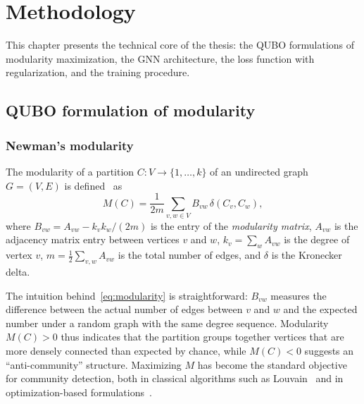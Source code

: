 
\section{Methodology}
\label{sec:methodology}

This chapter presents the technical core of the thesis: the QUBO
formulations of modularity maximization, the GNN architecture, the
loss function with regularization, and the training procedure.

\subsection{QUBO formulation of modularity}
\label{sec:method_qubo}

\subsubsection{Newman's modularity}
\label{sec:method_modularity}

The modularity of a partition $C: V \to \{1, \ldots, k\}$ of an
undirected graph $G = (V, E)$ is defined~\cite{newman2006modularity}
as
\begin{equation}
    M(C) = \frac{1}{2m} \sum_{v, w \in V} B_{vw} \, \delta(C_v, C_w),
    \label{eq:modularity}
\end{equation}
where $B_{vw} = A_{vw} - k_v k_w / (2m)$ is the entry of the
\emph{modularity matrix}, $A_{vw}$ is the adjacency matrix entry
between vertices $v$ and $w$, $k_v = \sum_w A_{vw}$ is the degree of
vertex $v$, $m = \frac{1}{2}\sum_{v, w} A_{vw}$ is the total number
of edges, and $\delta$ is the Kronecker delta.

The intuition behind~\eqref{eq:modularity} is straightforward:
$B_{vw}$ measures the difference between the actual number of edges
between $v$ and $w$ and the expected number under a random graph
with the same degree sequence. Modularity $M(C) > 0$ thus indicates
that the partition groups together vertices that are more densely
connected than expected by chance, while $M(C) < 0$ suggests an
``anti-community'' structure. Maximizing $M$ has become the standard
objective for community detection, both in classical algorithms such
as Louvain~\cite{blondel2008louvain} and in optimization-based
formulations~\cite{wang2024quantum}.

